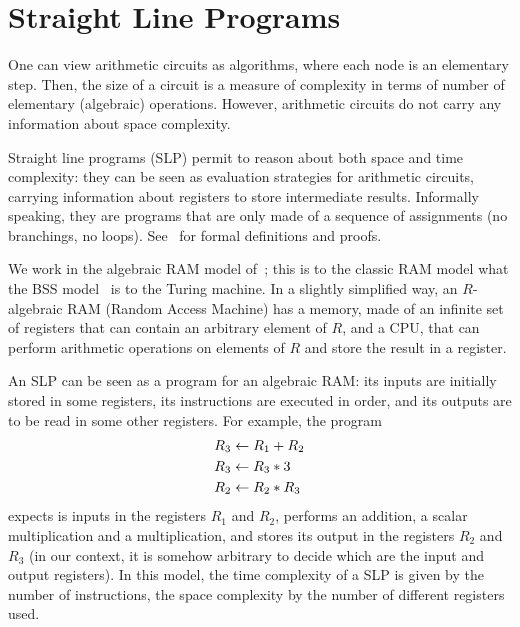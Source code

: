 \section{Straight Line Programs}
\label{sec:stra-line-progr}

One can view arithmetic circuits as algorithms, where each node is an
elementary step. Then, the size of a circuit is a measure of
complexity in terms of number of elementary (algebraic)
operations. However, arithmetic circuits do not carry any information
about space complexity.

Straight line programs
(SLP) permit to reason about
both space and time complexity: they can be seen as evaluation
strategies for arithmetic circuits, carrying information about
registers to store intermediate results. Informally speaking, they are
programs that are only made of a sequence of assignments (no
branchings, no loops).  See~\cite{burgisser+clausen-shokrollahi} for
formal definitions and proofs.

We work in the algebraic RAM model
of~\cite{kaltofen88:gcd}; this is to the classic RAM model what the
BSS model~\cite{BSS} is to the Turing machine. In a slightly
simplified way, an $R$-algebraic RAM (Random Access Machine) has a
memory, made of an infinite set of registers that can contain an
arbitrary element of $R$, and a CPU, that can perform arithmetic
operations on elements of $R$ and store the result in a register.

An SLP can be seen as a program for an algebraic RAM: its inputs are
initially stored in some registers, its instructions are executed in
order, and its outputs are to be read in some other registers. For
example, the program
\begin{equation}
  \label{eq:275}
  \begin{aligned}
    R_3 &\leftarrow R_1 + R_2\\
    R_3 &\leftarrow R_3 * 3\\
    R_2 &\leftarrow R_2 * R_3
  \end{aligned}
\end{equation}
expects is inputs in the registers $R_1$ and $R_2$, performs an
addition, a scalar multiplication and a multiplication, and stores its
output in the registers $R_2$ and $R_3$ (in our context, it is somehow
arbitrary to decide which are the input and output registers). In this
model, the time complexity of a SLP is given by the number of
instructions, the space complexity by the number of different
registers used.



